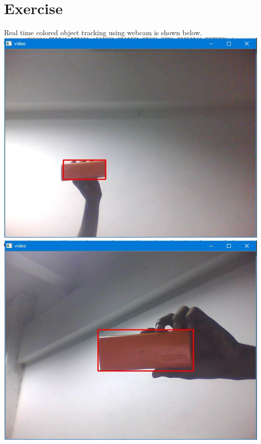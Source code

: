 \documentclass[11pt,a4paper]{article}
\begin{document}
	\section{Exercise}
	Real time colored object tracking using webcam is shown below.
	\newline
	\newline
	\includegraphics[scale=0.7]{image1.jpg}
	\newline
	\includegraphics[scale=0.7]{image2.jpg}
	
\end{document}
